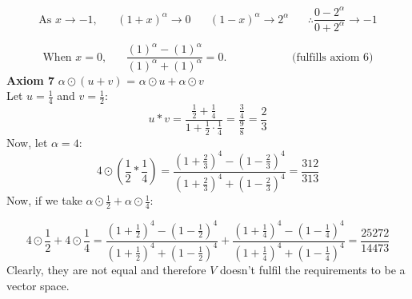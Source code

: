 \documentclass[12pt]{article}
\begin{document}
$$\text{As } x \to -1,
\hspace{20pt} (1+x)^\alpha\to0
\hspace{20pt} (1-x)^\alpha\to2^\alpha
\hspace{20pt} \therefore
\frac{0-2^\alpha}{0 + 2^\alpha}\to-1
$$

$$
\text{When } x=0,\hspace{20pt} \frac{(1)^\alpha-(1)^\alpha}{(1)^\alpha+(1)^\alpha}=0. \hspace{70pt} \text{(fulfills axiom 6)}
$$
\newpage
\textbf{Axiom 7} $\alpha \odot(u+v)$ = $\alpha \odot u + \alpha \odot v$\\
Let $u=\frac{1}{4}$ and $v=\frac{1}{2}$:\\
$$
u \ast v =
\frac{\frac{1}{2}+\frac{1}{4}}{1+\frac{1}{2}\cdot \frac{1}{4}} 
=\frac{\frac{3}{4}}{\frac{9}{8}}
=\frac{2}{3}
$$
Now, let $\alpha=4$:
$$
4
\odot
\left(\frac{1}{2}\ast \frac{1}{4}\right)
=
\frac{
\left(1+\frac{2}{3}\right)^4-\left(1-\frac{2}{3}\right)^4
}{
\left(1+\frac{2}{3}\right)^4+\left(1-\frac{2}{3}\right)^4
}
=
\frac{312}{313}
$$
Now, if we take $\alpha\odot \frac{1}{2} + \alpha\odot \frac{1}{4}$:

$$
4\odot \frac{1}{2}
+
4\odot \frac{1}{4}
=
\frac{
\left(
1+\frac{1}{2}
\right)^4
-
\left(
1-\frac{1}{2}
\right)^4
}{
\left(
1+\frac{1}{2}
\right)^4
+
\left(
1-\frac{1}{2}
\right)^4
}
+
\frac{
\left(
1+\frac{1}{4}
\right)^4
-
\left(
1-\frac{1}{4}
\right)^4
}{
\left(
1+\frac{1}{4}
\right)^4
+
\left(
1-\frac{1}{4}
\right)^4
}
=\frac{25272}{14473}
$$
Clearly, they are not equal and therefore $V$ doesn't fulfil the requirements to be a vector space.
\end{document}
